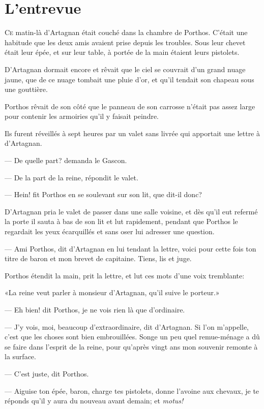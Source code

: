 \chapter{L'entrevue}

\lettrine{C}{e} matin-là d'Artagnan était couché dans la chambre de Porthos. C'était une habitude que les deux amis avaient prise depuis les troubles. Sous leur chevet était leur épée, et sur leur table, à portée de la main étaient leurs pistolets.

\zz
D'Artagnan dormait encore et rêvait que le ciel se couvrait d'un grand nuage jaune, que de ce nuage tombait une pluie d'or, et qu'il tendait son chapeau sous une gouttière.

Porthos rêvait de son côté que le panneau de son carrosse n'était pas assez large pour contenir les armoiries qu'il y faisait peindre.

Ils furent réveillés à sept heures par un valet sans livrée qui apportait une lettre à d'Artagnan.

— De quelle part? demanda le Gascon.

— De la part de la reine, répondit le valet.

— Hein! fit Porthos en se soulevant sur son lit, que dit-il donc?

D'Artagnan pria le valet de passer dans une salle voisine, et dès qu'il eut refermé la porte il sauta à bas de son lit et lut rapidement, pendant que Porthos le regardait les yeux écarquillés et sans oser lui adresser une question.

— Ami Porthos, dit d'Artagnan en lui tendant la lettre, voici pour cette fois ton titre de baron et mon brevet de capitaine. Tiens, lis et juge.

Porthos étendit la main, prit la lettre, et lut ces mots d'une voix tremblante:

«La reine veut parler à monsieur d'Artagnan, qu'il suive le porteur.»

— Eh bien! dit Porthos, je ne vois rien là que d'ordinaire.

— J'y vois, moi, beaucoup d'extraordinaire, dit d'Artagnan. Si l'on m'appelle, c'est que les choses sont bien embrouillées. Songe un peu quel remue-ménage a dû se faire dans l'esprit de la reine, pour qu'après vingt ans mon souvenir remonte à la surface.

— C'est juste, dit Porthos.

— Aiguise ton épée, baron, charge tes pistolets, donne l'avoine aux chevaux, je te réponds qu'il y aura du nouveau avant demain; et \textit{motus!}

